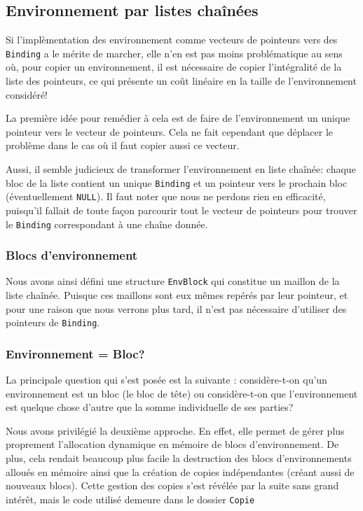 \documentclass[a4paper,11pt]{article}
\begin{document}
\subsection{Environnement par listes chaînées}

Si l'implèmentation des environnement comme vecteurs 
de pointeurs vers des \texttt{Binding} a le mérite de marcher, elle n'en est
pas moins problématique au sens où, pour copier un environnement, il est
nécessaire de copier l'intégralité de la liste des pointeurs, ce qui présente un
coût linéaire en la taille de l'environnement considéré!

La première idée pour remédier à cela est de faire de l'environnement un unique
pointeur vers le vecteur de pointeurs. Cela ne fait cependant que déplacer le
problème dans le cas où il faut copier aussi ce vecteur.

Aussi, il semble judicieux de transformer l’environnement en liste chaînée:
chaque bloc de la liste contient un unique \texttt{Binding} et un pointeur vers
le prochain bloc (éventuellement \texttt{NULL}). Il faut noter que nous ne perdons rien
en efficacité, puisqu'il fallait de toute façon parcourir tout le vecteur de
pointeurs pour trouver le \texttt{Binding} correspondant à une chaîne donnée.

\subsubsection{Blocs d’environnement}

Nous avons ainsi défini une structure \texttt{EnvBlock} qui constitue un maillon
de la liste chaînée. Puisque ces maillons sont eux mêmes repérés par leur
pointeur, et pour une raison que nous verrons plus tard, il n'est pas nécessaire
d'utiliser des pointeurs de \texttt{Binding}.

\subsubsection{Environnement = Bloc?}

La principale question qui s'est posée est la suivante : considère-t-on qu'un
environnement est un bloc (le bloc de \og tête\fg) ou considère-t-on que
l'environnement est quelque chose d'autre que la somme individuelle de ses
parties?

Nous avons privilégié la deuxième approche. En effet, elle permet de gérer plus
proprement l'allocation dynamique en mémoire de blocs d'environnement. De plus,
cela rendait beaucoup plus facile la destruction des blocs d'environnements
alloués en mémoire ainsi que la création de copies indépendantes (créant aussi
de nouveaux blocs). Cette gestion des copies s'est révélée par la suite sans
grand intérêt, mais le code utilisé demeure dans le dossier \texttt{Copie}
\end{document}
